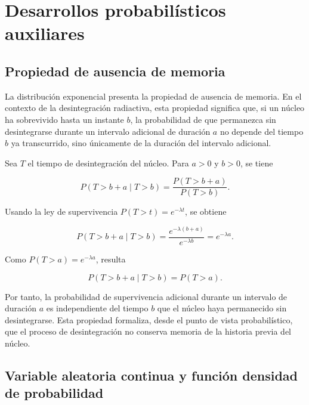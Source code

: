 \documentclass[12pt,a4paper]{article}
\begin{document}
\newpage
\printbibliography

\newpage
\appendix

\section{Desarrollos probabilísticos auxiliares}

\subsection{Propiedad de ausencia de memoria}
\label{ap:ausencia_memoria}

La distribución exponencial presenta la propiedad de ausencia de memoria. En el contexto de la desintegración radiactiva, esta propiedad significa que, si un núcleo ha sobrevivido hasta un instante $b$, la probabilidad de que permanezca sin desintegrarse durante un intervalo adicional de duración $a$ no depende del tiempo $b$ ya transcurrido, sino únicamente de la duración del intervalo adicional.

Sea $T$ el tiempo de desintegración del núcleo. Para $a>0$ y $b>0$, se tiene

\begin{equation}
    P(T>b+a \mid T>b)
    =
    \frac{P(T>b+a)}{P(T>b)}.
\end{equation}

Usando la ley de supervivencia $P(T>t)=e^{-\lambda t}$, se obtiene

\begin{equation}
    P(T>b+a \mid T>b)
    =
    \frac{e^{-\lambda(b+a)}}{e^{-\lambda b}}
    =
    e^{-\lambda a}.
\end{equation}

Como $P(T>a)=e^{-\lambda a}$, resulta

\begin{equation}
    P(T>b+a \mid T>b)=P(T>a).
\end{equation}

Por tanto, la probabilidad de supervivencia adicional durante un intervalo de duración $a$ es independiente del tiempo $b$ que el núcleo haya permanecido sin desintegrarse. Esta propiedad formaliza, desde el punto de vista probabilístico, que el proceso de desintegración no conserva memoria de la historia previa del núcleo.

\subsection{Variable aleatoria continua y función densidad de probabilidad}
\label{ap:variable_aleatoria_continua}
\end{document}
